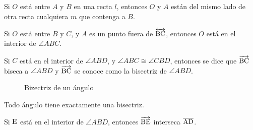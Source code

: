 \begin{theorem}
    Si $O$ está entre $A$ y $B$ en una recta $l$, entonces $O$ y $A$ están del mismo lado de otra recta cualquiera $m$ que contenga a $B$.
\end{theorem}

\begin{theorem}
    Si $O$ está entre $B$ y $C$, y $A$ es un punto fuera de $\overleftrightarrow{\rm BC}$, entonces $O$ está en el interior de $\angle{ABC}$.
\end{theorem}

\begin{definition}
    Si $C$ está en el interior de $\angle{ABD}$, y $\angle{ABC} \cong \angle{CBD}$, entonces se dice que $\overrightarrow{\rm BC}$ biseca a $\angle{ABD}$ y $\overrightarrow{\rm BC}$ se conoce como la bisectriz de $\angle{ABD}$. 

    \begin{figure}[!h]
        \centering
        
        \caption{Bizectriz de un ángulo}
        \label{fig:angle-bisector}
    \end{figure}
    
\end{definition}

\begin{theorem}
    Todo ángulo tiene exactamente una bisectriz.
\end{theorem}

\begin{theorem}
    Si $\rm E$ está en el interior de $\angle{ABD}$, entonces $\overrightarrow{\rm BE}$ interseca $\overline{\rm AD}$.
\end{theorem}